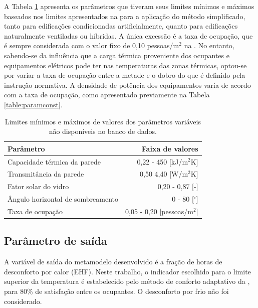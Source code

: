 \documentclass[brazil,hardcopy,openany,a5paper]{ufscthesis}
\begin{document}
		A Tabela \ref{table:paraminic} apresenta os parâmetros que tiveram seus limites mínimos e máximos baseados nos limites apresentados na  \cite{INIC} para a aplicação do método simplificado, tanto para edificações condicionadas artificialmente, quanto para edificações naturalmente ventiladas ou híbridas.
		A única excessão é a taxa de ocupação, que é sempre considerada com o valor fixo de 0,10 pessoas/m$^2$ na . No entanto, sabendo-se da influência que a carga térmica proveniente dos ocupantes e equipamentos elétricos pode ter nas temperaturas das zonas térmicas, optou-se por variar a taxa de ocupação entre a metade e o dobro do que é definido pela instrução normativa. A densidade de potência dos equipamentos varia de acordo com a taxa de ocupação, como apresentado previamente na Tabela \ref{table:paramconst}.
		
		\begin{table}[h]
			\centering
			\caption{Limites mínimos e máximos de valores dos parâmetros variáveis não disponíveis no banco de dados.}
			\label{table:paraminic}
			\begin{tabular}{|l |r |}
				\hline
				\textbf{Parâmetro} & \textbf{Faixa de valores} \\
				\hline
				Capacidade térmica da parede & 0,22 - 450 [kJ/m$^2$K] \\
				\hline
				Transmitância da parede & 0,50 4,40 [W/m$^2$K] \\
				\hline
				Fator solar do vidro & 0,20 - 0,87 [-] \\
				\hline 
				Ângulo horizontal de sombreamento & 0 - 80 [$^{\circ}$] \\
				\hline 
				Taxa de ocupação & 0,05 - 0,20 [pessoas/m$^2$] \\
				\hline 
			\end{tabular}
		\end{table}
	
		\subsection{Parâmetro de saída}
		
		A variável de saída do metamodelo desenvolvido é a fração de horas de desconforto por calor (EHF). Neste trabalho, o indicador escolhido para o limite superior da temperatura é estabelecido pelo método de conforto adaptativo da  \cite{ASHRAEStandard552017}, para 80\% de satisfação entre os ocupantes. O desconforto por frio não foi considerado.
\end{document}
